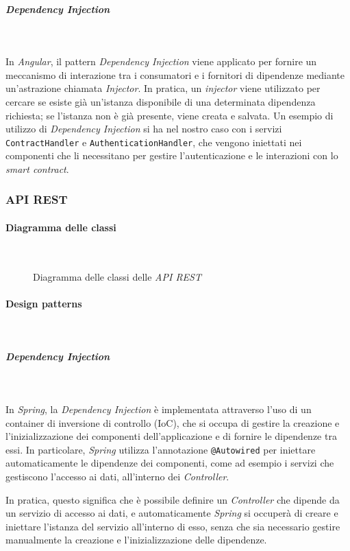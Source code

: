 \subparagraph*{Dependency Injection}~

\noindent In \textit{Angular}, il pattern \textit{Dependency Injection} viene applicato per fornire un meccanismo di interazione tra i consumatori e i fornitori di dipendenze mediante un'astrazione chiamata \textit{Injector}. In pratica, un \textit{injector} viene utilizzato per cercare se esiste già un'istanza disponibile di una determinata dipendenza richiesta; se l'istanza non è già presente, viene creata e salvata. Un esempio di utilizzo di \textit{Dependency Injection} si ha nel nostro caso con i servizi \texttt{ContractHandler} e \texttt{AuthenticationHandler}, che vengono iniettati nei componenti che li necessitano per gestire l'autenticazione e le interazioni con lo \textit{smart contract}.

\subsubsection{API REST}
\paragraph{Diagramma delle classi}~
\begin{figure}[H]
    
    \caption{Diagramma delle classi delle \textit{API REST}}\label{fig:apirest}
\end{figure}

\paragraph{Design patterns}~

\subparagraph*{Dependency Injection}~

\noindent In \textit{Spring}, la \textit{Dependency Injection} è implementata attraverso l'uso di un container di inversione di controllo (IoC), che si occupa di gestire la creazione e l'inizializzazione dei componenti dell'applicazione e di fornire le dipendenze tra essi. In particolare, \textit{Spring} utilizza l'annotazione \texttt{@Autowired} per iniettare automaticamente le dipendenze dei componenti, come ad esempio i servizi che gestiscono l'accesso ai dati, all'interno dei \textit{Controller}.

In pratica, questo significa che è possibile definire un \textit{Controller} che dipende da un servizio di accesso ai dati, e automaticamente \textit{Spring} si occuperà di creare e iniettare l'istanza del servizio all'interno di esso, senza che sia necessario gestire manualmente la creazione e l'inizializzazione delle dipendenze.

